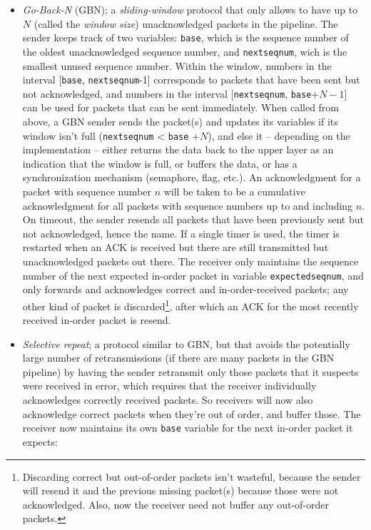 \documentclass[table, xcdraw]{article}%
\begin{document}
\begin{enumerate}
    \begin{itemize}
        \item \emph{Go-Back-N} (GBN); a \emph{sliding-window} protocol that only allows to have up to $N$ (called the \emph{window size}) unacknowledged packets in the pipeline. The sender keeps track of two variables: \texttt{base}, which is the sequence number of the oldest unacknowledged sequence number, and \texttt{nextseqnum}, wich is the smallest unused sequence number. Within the window, numbers in the interval [\texttt{base}, \texttt{nextseqnum}-1] corresponds to packets that have been sent but not acknowledged, and numbers in the interval [\texttt{nextseqnum}, \texttt{base}$+N-1$] can be used for packets that can be sent immediately. When called from above, a GBN sender sends the packet(s) and updates its variables if its window isn't full (\texttt{nextseqnum} < \texttt{base} $+ N$), and else it -- depending on the implementation -- either returns the data back to the upper layer as an indication that the window is full, or buffers the data, or has a synchronization mechanism (semaphore, flag, etc.). An acknowledgment for a packet with sequence number $n$ will be taken to be a cumulative acknowledgment for all packets with sequence numbers up to and including $n$. On timeout, the sender resends all packets that have been previously sent but not acknowledged, hence the name. If a single timer is used, the timer is restarted when an ACK is received but there are still transmitted but unacknowledged packets out there. The receiver only maintains the sequence number of the next expected in-order packet in variable \texttt{expectedseqnum}, and only forwards and acknowledges correct and in-order-received packets; any other kind of packet is discarded\footnote{Discarding correct but out-of-order packets isn't wasteful, because the sender will resend it and the previous missing packet(s) because those were not acknowledged. Also, now the receiver need not buffer any out-of-order packets.}, after which an ACK for the most recently received in-order packet is resend.
        \item \emph{Selective repeat}; a protocol similar to GBN, but that avoids the potentially large number of retransmissions (if there are many packets in the GBN pipeline) by having the sender retransmit only those packets that it suspects were received in error, which requires that the receiver individually acknowledges correctly received packets. So receivers will now also acknowledge correct packets when they're out of order, and buffer those. The receiver now maintains its own \texttt{base} variable for the next in-order packet it expects:

\end{itemize}
\end{enumerate}
\end{document}
